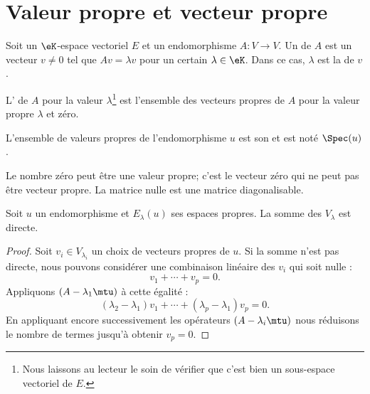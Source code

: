 
\section{Valeur propre et vecteur propre}

\begin{definition}      \label{DefooMMKZooVcskCc}
    Soit un \( \eK\)-espace vectoriel \( E\) et un endomorphisme \( A\colon V\to V\). Un  de \( A\) est un vecteur \( v \neq 0\) tel que \( Av=\lambda v\) pour un certain \( \lambda\in \eK\). Dans ce cas, \( \lambda\) est la  de \( v\).

    L' de \( A\) pour la valeur \( \lambda\)\footnote{Nous laissons au lecteur le soin de vérifier que c'est bien un sous-espace vectoriel de \( E\).} est l'ensemble des vecteurs propres de \( A\) pour la valeur propre \( \lambda\) et zéro.
\end{definition}
L'ensemble de valeurs propres de l'endomorphisme \( u\) est son  et est noté \( \Spec(u)\).

\begin{remark}
    Le nombre zéro peut être une valeur propre; c'est le vecteur zéro qui ne peut pas être vecteur propre. La matrice nulle est une matrice diagonalisable.
\end{remark}

\begin{lemma}       \label{LemjcztYH}
    Soit \( u\) un endomorphisme et \( E_{\lambda}(u)\) ses espaces propres. La somme des \( V_{\lambda}\) est directe.
\end{lemma}

\begin{proof}
    Soit \( v_i\in V_{\lambda_i}\) un choix de vecteurs propres de \( u\). Si la somme n'est pas directe, nous pouvons considérer une combinaison linéaire des \( v_i\) qui soit nulle :
    \begin{equation}
        v_1+\cdots+v_p=0.
    \end{equation}
    Appliquons \( (A-\lambda_1\mtu)\) à cette égalité :
    \begin{equation}
        (\lambda_2-\lambda_1)v_1+\cdots+(\lambda_p-\lambda_1)v_p=0.
    \end{equation}
    En appliquant encore successivement les opérateurs \( (A-\lambda_i\mtu)\) nous réduisons le nombre de termes jusqu'à obtenir \( v_p=0\).
\end{proof}

